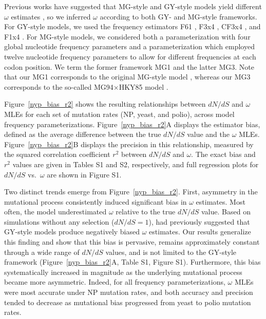\documentclass[11pt]{article}
\begin{document}
Previous works have suggested that MG-style and GY-style models yield different $\omega$ estimates \citep{KosakovskyPondMuse2005,Yap2010}, so we inferred $\omega$ according to both GY- and MG-style frameworks. For GY-style models, we used the frequency estimators F61 \citep{GoldmanYang1994}, F3x4 \citep{GoldmanYang1994}, CF3x4 \citep{KosakovskyPond2010}, and F1x4 \citep{MuseGaut1994}. For MG-style models, we considered both a parameterization with four global nucleotide frequency parameters and a parameterization which employed twelve nucleotide frequency parameters to allow for different frequencies at each codon position. We term the former framework MG1 and the latter MG3. Note that our MG1 corresponds to the original MG-style model \citep{MuseGaut1994}, whereas our MG3 corresponds to the so-called MG94$\times$HKY85 model \citep{KosakovskyPondMuse2005}. 

Figure~\ref{nyp_bias_r2} shows the resulting relationships between $dN/dS$ and $\omega$ MLEs for each set of mutation rates (NP, yeast, and polio), across model frequency parameterizations. Figure~\ref{nyp_bias_r2}A displays the estimator bias, defined as the average difference between the true $dN/dS$ value and the $\omega$ MLEs. Figure~\ref{nyp_bias_r2}B displays the precision in this relationship, measured by the squared correlation coefficient $r^2$ between $dN/dS$ and $\omega$. The exact bias and $r^2$ values are given in Tables S1 and S2, respectively, and full regression plots for $dN/dS$ vs.\ $\omega$ are shown in Figure S1.

Two distinct trends emerge from Figure~\ref{nyp_bias_r2}. First, asymmetry in the mutational process consistently induced significant bias in $\omega$ estimates. Most often, the model underestimated $\omega$ relative to the true $dN/dS$ value. Based on simulations without any selection ($dN/dS = 1$),  \citet{Yap2010} had previously suggested that GY-style models produce negatively biased $\omega$ estimates. Our results generalize this finding and show that this bias is pervasive, remains approximately constant through a wide range of $dN/dS$ values, and is not limited to the GY-style framework (Figure~\ref{nyp_bias_r2}A, Table S1, Figure S1). Furthermore, this bias systematically increased in magnitude as the underlying mutational process became more asymmetric. Indeed, for all frequency parameterizations, $\omega$ MLEs were most accurate under NP mutation rates, and both accuracy and precision tended to decrease as mutational bias progressed from yeast to polio mutation rates. 
\end{document}
